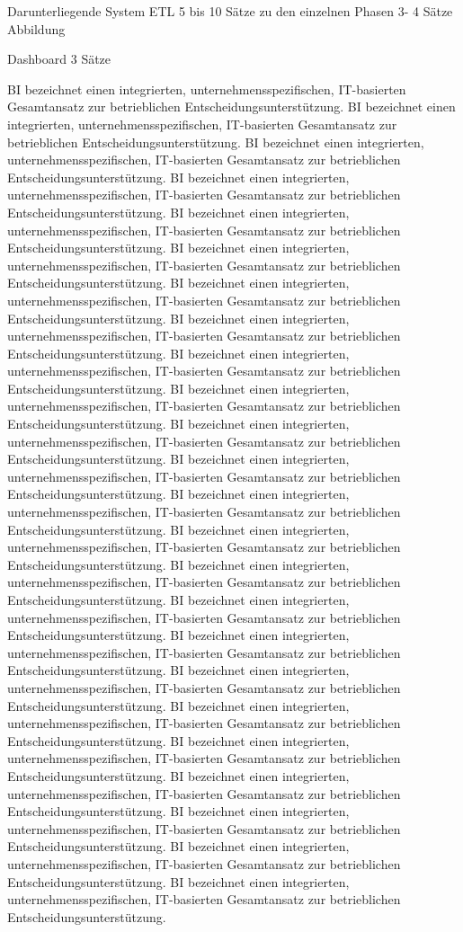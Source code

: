 Darunterliegende System
ETL 5 bis 10 Sätze
zu den einzelnen Phasen
3- 4 Sätze
Abbildung

Dashboard
3 Sätze

BI bezeichnet einen integrierten, unternehmensspezifischen, IT-basierten Gesamtansatz zur betrieblichen Entscheidungsunterstützung.
BI bezeichnet einen integrierten, unternehmensspezifischen, IT-basierten Gesamtansatz zur betrieblichen Entscheidungsunterstützung.
BI bezeichnet einen integrierten, unternehmensspezifischen, IT-basierten Gesamtansatz zur betrieblichen Entscheidungsunterstützung.
BI bezeichnet einen integrierten, unternehmensspezifischen, IT-basierten Gesamtansatz zur betrieblichen Entscheidungsunterstützung.
BI bezeichnet einen integrierten, unternehmensspezifischen, IT-basierten Gesamtansatz zur betrieblichen Entscheidungsunterstützung.
BI bezeichnet einen integrierten, unternehmensspezifischen, IT-basierten Gesamtansatz zur betrieblichen Entscheidungsunterstützung.
BI bezeichnet einen integrierten, unternehmensspezifischen, IT-basierten Gesamtansatz zur betrieblichen Entscheidungsunterstützung.
BI bezeichnet einen integrierten, unternehmensspezifischen, IT-basierten Gesamtansatz zur betrieblichen Entscheidungsunterstützung.
BI bezeichnet einen integrierten, unternehmensspezifischen, IT-basierten Gesamtansatz zur betrieblichen Entscheidungsunterstützung.
BI bezeichnet einen integrierten, unternehmensspezifischen, IT-basierten Gesamtansatz zur betrieblichen Entscheidungsunterstützung.
BI bezeichnet einen integrierten, unternehmensspezifischen, IT-basierten Gesamtansatz zur betrieblichen Entscheidungsunterstützung.
BI bezeichnet einen integrierten, unternehmensspezifischen, IT-basierten Gesamtansatz zur betrieblichen Entscheidungsunterstützung.
BI bezeichnet einen integrierten, unternehmensspezifischen, IT-basierten Gesamtansatz zur betrieblichen Entscheidungsunterstützung.
BI bezeichnet einen integrierten, unternehmensspezifischen, IT-basierten Gesamtansatz zur betrieblichen Entscheidungsunterstützung.
BI bezeichnet einen integrierten, unternehmensspezifischen, IT-basierten Gesamtansatz zur betrieblichen Entscheidungsunterstützung.
BI bezeichnet einen integrierten, unternehmensspezifischen, IT-basierten Gesamtansatz zur betrieblichen Entscheidungsunterstützung.
BI bezeichnet einen integrierten, unternehmensspezifischen, IT-basierten Gesamtansatz zur betrieblichen Entscheidungsunterstützung.
BI bezeichnet einen integrierten, unternehmensspezifischen, IT-basierten Gesamtansatz zur betrieblichen Entscheidungsunterstützung.
BI bezeichnet einen integrierten, unternehmensspezifischen, IT-basierten Gesamtansatz zur betrieblichen Entscheidungsunterstützung.
BI bezeichnet einen integrierten, unternehmensspezifischen, IT-basierten Gesamtansatz zur betrieblichen Entscheidungsunterstützung.
BI bezeichnet einen integrierten, unternehmensspezifischen, IT-basierten Gesamtansatz zur betrieblichen Entscheidungsunterstützung.
BI bezeichnet einen integrierten, unternehmensspezifischen, IT-basierten Gesamtansatz zur betrieblichen Entscheidungsunterstützung.
BI bezeichnet einen integrierten, unternehmensspezifischen, IT-basierten Gesamtansatz zur betrieblichen Entscheidungsunterstützung.
BI bezeichnet einen integrierten, unternehmensspezifischen, IT-basierten Gesamtansatz zur betrieblichen Entscheidungsunterstützung.

